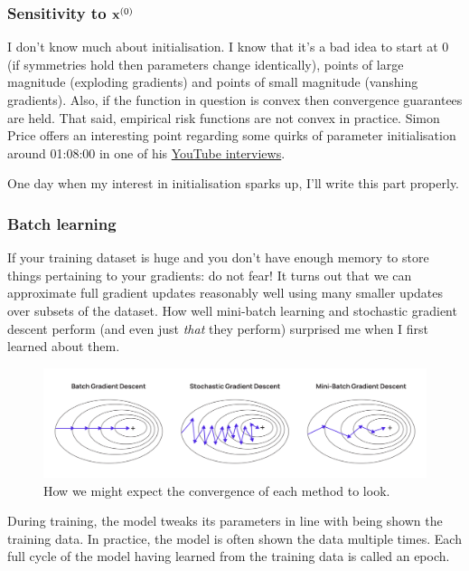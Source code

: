 \documentclass[11pt]{article}
\begin{document}
\subsubsection{Sensitivity to $\mathbf{x}^{(0)}$}
I don't know much about initialisation. I know that it's a bad idea to start at 0 (if symmetries hold then parameters change identically), points of large magnitude (exploding gradients) and points of small magnitude (vanshing gradients). Also, if the function in question is convex then convergence guarantees are held. That said, empirical risk functions are not convex in practice. Simon Price offers an interesting point regarding some quirks of parameter initialisation around 01:08:00 in one of his \href{https://www.youtube.com/watch?v=sJXn4Cl4oww&list=PLwFLAA-F1PgpU9lgxOdhjILkMXUagGnea&ab_channel=MachineLearningStreetTalk}{YouTube interviews}.

One day when my interest in initialisation sparks up, I'll write this part properly.

\subsubsection{Batch learning}
If your training dataset is huge and you don't have enough memory to store things pertaining to your gradients: do not fear! It turns out that we can approximate full gradient updates reasonably well using many smaller updates over subsets of the dataset. How well mini-batch learning and stochastic gradient descent perform (and even just \textit{that} they perform) surprised me when I first learned about them.

\begin{figure}[t]
    \centering
    \includegraphics[width=\columnwidth]{./figures/gradient_descent/gradient_descent_types.png}
    \caption{How we might expect the convergence of each method to look. }
    \label{fig:gradient_descent_types}
\end{figure}

\begin{tcolorbox}[title={\centering\textbf{Epoch terminology}}, colback=myLightBlue, colbacktitle=myDarkBlue, colframe=myDarkBlue, coltitle=white]
    During training, the model tweaks its parameters in line with being shown the training data. In practice, the model is often shown the data multiple times. Each full cycle of the model having learned from the training data is called an epoch.
\end{tcolorbox}
\end{document}
